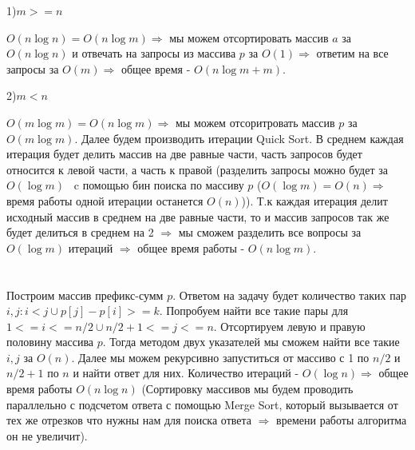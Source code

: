 \documentclass{article}
\begin{document}
\begin{flushleft}
1)$m >= n$

$O(n \log{n}) = O(n\log{m}) \Rightarrow$ мы можем отсортировать массив $a$ за $O(n \log{n})$ и отвечать на запросы из массива $p$ за $O(1) \Rightarrow$ ответим на все запросы за $O(m) \Rightarrow$ общее время - $O(n\log{m} + m)$.

2)$m < n$

$O(m \log{m}) = O(n\log{m}) \Rightarrow$ мы можем отсоритровать массив $p$ за $O(m\log{m})$. Далее будем производить итерации Quick Sort. В среднем каждая итерация будет делить массив на две равные части, часть запросов будет относится к левой части, а часть к правой (разделить запросы можно будет за $O(\log{m})$  c помощью бин поиска по массиву $p$ ($O(\log{m}) = O(n) \Rightarrow$ время работы одной итерации останется $O(n)$)). Т.к каждая итерация делит исходный массив в среднем на две равные части, то и массив запросов так же будет делиться в среднем на 2 $\Rightarrow$ мы сможем разделить все вопросы за $O(\log{m})$ итераций $\Rightarrow$ общее время работы - $O(n \log{m})$. 

\section{}


Построим массив префикс-сумм $p$. Ответом на задачу будет количество таких пар $i, j: i < j \cup p[j] - p[i] >= k$. Попробуем найти все такие пары для $1 <= i <= n / 2 \cup n / 2 + 1 <= j <= n$. Отсортируем левую и правую половину массива $p$. Тогда методом двух указателей мы сможем найти все такие $i, j$ за $O(n)$. Далее мы можем рекурсивно запуститься от массиво с 1 по $n / 2$ и $n / 2 + 1 $ по $n$ и найти ответ для них. Количество итераций - $O(\log{n}) \Rightarrow$ общее время работы $O(n \log{n})$ (Сортировку массивов мы будем проводить параллельно с подсчетом ответа с помощью Merge Sort, который вызывается от тех же отрезков что нужны нам для поиска ответа $\Rightarrow$ времени работы алгоритма он не увеличит).
\end{flushleft}
\end{document}
